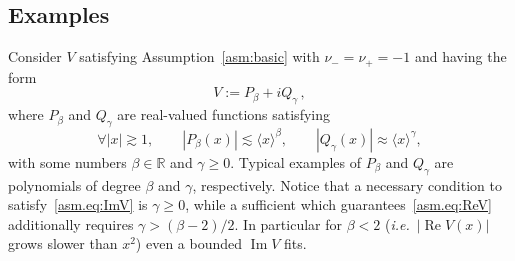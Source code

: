 \subsection{Examples}
\label{subsec:Ex.1}

\begin{Example}
	\label{ex:pol.1}
Consider $V$ satisfying Assumption~\ref{asm:basic} with $\nu_-=\nu_+=-1$ 
and having the form 
\begin{equation}
  V := P_\beta + i Q_\gamma 
  \,,
\end{equation}
where $P_\beta$ and $Q_\gamma$ are real-valued functions satisfying 
\begin{equation}\label{PandQ}
\forall |x| {\gtrsim} 1, \qquad 
|P_\beta(x)| {\lesssim} \langle x \rangle^\beta,
\qquad 
|Q_\gamma(x)| \approx \langle x \rangle^{\gamma},
\end{equation}
with some numbers $\beta\in{\mathbb{R}}$ and $\gamma \geq 0$.
Typical examples of $P_\beta$ and $Q_\gamma$
are polynomials of degree $\beta$ and $\gamma$, respectively. 
Notice that a necessary condition to satisfy~\eqref{asm.eq:ImV} 
is $\gamma \geq 0$, while a sufficient which guarantees~\eqref{asm.eq:ReV} 
additionally requires $\gamma > (\beta-2)/2$.
In particular for $\beta <2$ ({\emph{i.e.}}~$|{\operatorname{Re}} V(x)|$ 
grows slower than $x^2$) even a bounded ${\operatorname{Im}} V$ fits.


\end{Example}
